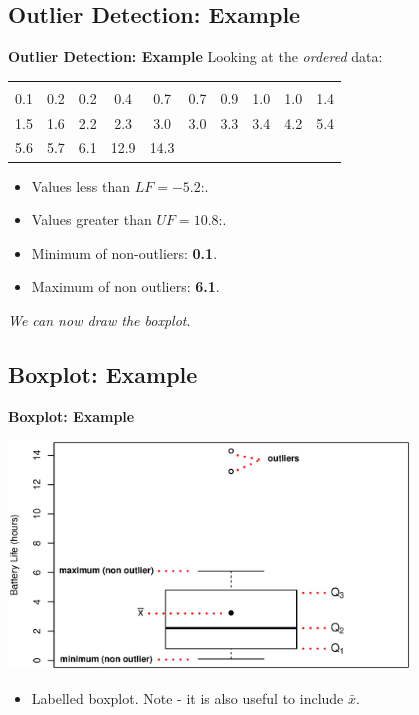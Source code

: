 \documentclass[compress]{beamer}        %
\makeatletter
\newcommand{\tcb}{\textcolor{beamer@blendedblue}}
\makeatother
\begin{document}
\subsection{Outlier Detection: Example}
\begin{frame}{\bf \tcb{Outlier Detection: Example}}
Looking at the \emph{ordered} data:
\begin{center}
\begin{tabular}{|cccccccccc|}
\hline
&&&&&&&&&\\[-0.4cm]
0.1 & 0.2 & 0.2 & 0.4 & 0.7 & 0.7 & 0.9 & 1.0  & 1.0 & 1.4 \\
1.5 & 1.6 & 2.2 & 2.3 & 3.0 & 3.0 & 3.3 & 3.4 & 4.2 & 5.4  \\
5.6 & 5.7 & 6.1 & 12.9 & 14.3 &&&&&\\
\hline
\end{tabular}
\end{center}

\begin{itemize}
\item Values less than $LF = - 5.2$:.
\item Values greater than $UF = 10.8$:.\\[0.3cm]
\item Minimum of non-outliers: {\bf 0.1}.
\item Maximum of non outliers: {\bf 6.1}.\\[0.5cm]
\end{itemize}

\emph{We can now draw the boxplot}.

\end{frame}



\subsection{Boxplot: Example}
\begin{frame}{\bf \tcb{Boxplot: Example}\\[-1.1cm]}
\begin{center}
\includegraphics[width=0.8\textwidth, trim = 0.0cm 0.5cm 0.3cm 1cm, clip]{BoxplotLabelled}
\end{center}
\begin{itemize}\itemsep0.2cm
\item Labelled boxplot. Note - it is also useful to include $\bar x$.
\end{itemize}

\end{frame}
\end{document}
